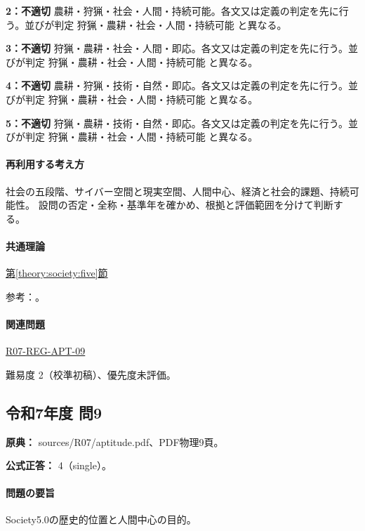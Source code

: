 \noindent\textbf{2：不適切} 農耕・狩猟・社会・人間・持続可能。各文又は定義の判定を先に行う。並びが判定 狩猟・農耕・社会・人間・持続可能 と異なる。\par

\noindent\textbf{3：不適切} 狩猟・農耕・社会・人間・即応。各文又は定義の判定を先に行う。並びが判定 狩猟・農耕・社会・人間・持続可能 と異なる。\par

\noindent\textbf{4：不適切} 農耕・狩猟・技術・自然・即応。各文又は定義の判定を先に行う。並びが判定 狩猟・農耕・社会・人間・持続可能 と異なる。\par

\noindent\textbf{5：不適切} 狩猟・農耕・技術・自然・即応。各文又は定義の判定を先に行う。並びが判定 狩猟・農耕・社会・人間・持続可能 と異なる。\par

\paragraph{再利用する考え方} 社会の五段階、サイバー空間と現実空間、人間中心、経済と社会的課題、持続可能性。 設問の否定・全称・基準年を確かめ、根拠と評価範囲を分けて判断する。

\paragraph{共通理論} \hyperref[theory:society:five]{第\ref*{theory:society:five}節}

\par 参考：\cite{eth54_society2021}。

\paragraph{関連問題} \hyperref[q:r07-reg-apt-09]{R07-REG-APT-09}

\par 難易度 2（校準初稿）、優先度未評価。

\subsection{令和7年度 問9}
\label{q:r07-reg-apt-09}

\noindent\textbf{原典：} sources/R07/aptitude.pdf、PDF物理9頁。

\textbf{公式正答：} 4（single）。

\paragraph{問題の要旨} Society5.0の歴史的位置と人間中心の目的。

